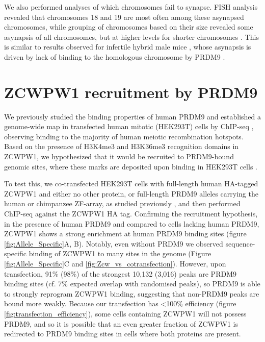 We also performed analyses of which chromosomes fail to synapse. FISH analysis revealed that chromosomes 18 and 19 are most often among these asynapsed chromosomes, while grouping of chromosomes based on their size revealed some asynapsis of all chromosomes, but at higher levels for shorter chromosomes \iffalse supp fig 9 \fi. This is similar to results observed for infertile hybrid male mice \parencite{Bhattacharyya2013Mechanistic}, whose asynapsis is driven by lack of binding to the homologous chromosome by PRDM9 \parencite{Davies2016Reengineering}. 



\section{ZCWPW1 recruitment by PRDM9}
We previously studied the binding properties of human PRDM9 and established a genome-wide map in transfected human mitotic (HEK293T) cells by ChIP-seq \parencite{Altemose2017map}, observing binding to the majority of human meiotic recombination hotspots. Based on the presence of H3K4me3 and H3K36me3 recognition domains in ZCWPW1, we hypothesized that it would be recruited to PRDM9-bound genomic sites, where these marks are deposited upon binding in HEK293T cells \parencite{Altemose2017map}.

To test this, we co-transfected HEK293T cells with full-length human HA-tagged ZCWPW1 and either no other protein, or full-length PRDM9 alleles carrying the human or chimpanzee ZF-array, as studied previously \parencite{Altemose2017map}, and then performed ChIP-seq against the ZCWPW1 HA tag. Confirming the recruitment hypothesis, in the presence of human PRDM9 and compared to cells lacking human PRDM9, ZCWPW1 shows a strong enrichment at human PRDM9 binding sites (figure \ref{fig:Allele_Specific}A, B). Notably, even without PRDM9 we observed sequence-specific binding of ZCWPW1 to many sites in the genome (Figure \ref{fig:Allele_Specific}C and \ref{fig:Zcw_vs_cotransfection}). However, upon transfection, 91\% (98\%) of the strongest 10,132 (3,016) peaks are PRDM9 binding sites (cf. 7\% expected overlap with randomised peaks), so PRDM9 is able to strongly reprogram ZCWPW1 binding, suggesting that non-PRDM9 peaks are bound more weakly. Because our transfection has <100\% efficiency (figure \ref{fig:transfection_efficiency}), some cells containing ZCWPW1 will not possess PRDM9, and so it is possible that an even greater fraction of ZCWPW1 is redirected to PRDM9 binding sites in cells where both proteins are present. 


